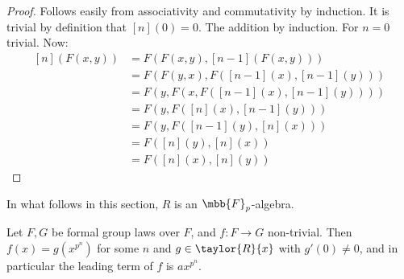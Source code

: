 \begin{proof}
	Follows easily from associativity and commutativity by induction.
	It is trivial by definition that $\left[n\right]\left(0\right)=0$.
	The addition by induction. For $n=0$ trivial.
	Now:
	\begin{align*}
		\left[n\right]\left(F\left(x,y\right)\right)
		&= F\left(
			F\left(x,y\right),
			\left[n-1\right]\left(F\left(x,y\right)\right)
		\right)\\
		&= F\left(
			F\left(y,x\right),
			F\left(\left[n-1\right]\left(x\right),\left[n-1\right]\left(y\right)\right)
		\right)\\
		&= F\left(
			y,
			F\left(
				x,
				F\left(\left[n-1\right]\left(x\right),\left[n-1\right]\left(y\right)\right)
			\right)
		\right)\\
		&= F\left(
			y,
			F\left(
				\left[n\right]\left(x\right)
				,\left[n-1\right]\left(y\right)
			\right)
		\right)\\
		&= F\left(
			y,
			F\left(
				\left[n-1\right]\left(y\right),
				\left[n\right]\left(x\right)
			\right)
		\right)\\
		&= F\left(
			\left[n\right]\left(y\right),
			\left[n\right]\left(x\right)
		\right)\\
		&= F\left(
			\left[n\right]\left(x\right),
			\left[n\right]\left(y\right)
		\right)
	\end{align*}
\end{proof}

In what follows in this section, $R$ is an $\mbb{F}_p$-algebra.

\begin{lemma*}
	Let $F,G$ be formal group laws over $F$, and $f: F \to G$ non-trivial.
	Then $f\left(x\right) = g\left(x^{p^n}\right)$ for some $n$ and $g\in \taylor{R}{x}$ with $g'\left(0\right) \neq 0$, and in particular the leading term of $f$ is $ax^{p^n}$.
\end{lemma*}

